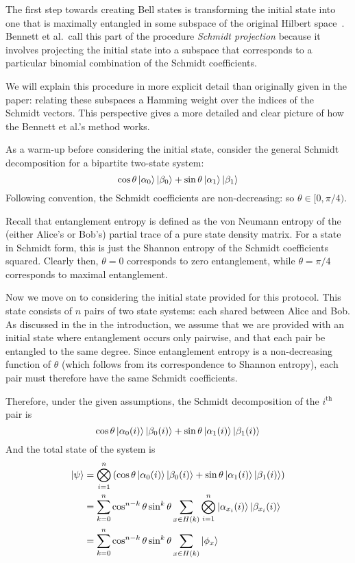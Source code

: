 The first step towards creating Bell states is transforming the initial state into one that is maximally entangled in some subspace of the original Hilbert space~\cite{bennett1996concentrating}.
Bennett et al.\ call this part of the procedure \emph{Schmidt projection} because it involves projecting the initial state into a subspace that corresponds to a particular binomial combination of the Schmidt coefficients.

We will explain this procedure in more explicit detail than originally given in the paper: relating these subspaces a Hamming weight over the indices of the Schmidt vectors. 
This perspective gives a more detailed and clear picture of how the Bennett et al.'s method works.

As a warm-up before considering the initial state, consider the general Schmidt decomposition for a bipartite two-state system:
$$
\cos\theta \ket{\alpha_0} \ket{\beta_0} + 
\sin\theta \ket{\alpha_1} \ket{\beta_1}
$$
Following convention, the Schmidt coefficients are non-decreasing: so $\theta \in [0, \pi/4)$.

Recall that entanglement entropy is defined as the von Neumann entropy of the (either Alice's or Bob's) partial trace of a pure state density matrix.
For a state in Schmidt form, this is just the Shannon entropy of the Schmidt coefficients squared.
Clearly then, $\theta = 0$ corresponds to zero entanglement, while $\theta = \pi/4$ corresponds to maximal entanglement.

Now we move on to considering the initial state provided for this protocol. This state consists of $n$ pairs of two state systems: each shared between Alice and Bob. As discussed in the in the introduction, we assume that we are provided with an initial state where entanglement occurs only pairwise, and that each pair be entangled to the same degree. Since entanglement entropy is a non-decreasing function of $\theta$  (which follows from its correspondence to Shannon entropy), each pair must therefore have the same Schmidt coefficients.

Therefore, under the given assumptions, the Schmidt decomposition of the $i^{\text{th}}$ pair is  
$$
\cos\theta \ket{\alpha_0(i)} \ket{\beta_0(i)} + 
\sin\theta \ket{\alpha_1(i)} \ket{\beta_1(i)}
$$
And the total state of the system is
\begin{align*}
	\ket{\psi} &= \bigotimes_{i=1}^n \left( 
	\cos\theta \ket{\alpha_0(i)} \ket{\beta_0(i)} + 
	\sin\theta \ket{\alpha_1(i)} \ket{\beta_1(i)} \right) \\
	&= \sum_{k=0}^n \cos^{n-k}\theta \sin^k\theta
	\sum_{x \in H(k)} \bigotimes_{i=1}^n 
	\ket{\alpha_{x_i}(i)} \ket{\beta_{x_i}(i)} \\
	&=  \sum_{k=0}^n \cos^{n-k}\theta \sin^k\theta
	\sum_{x \in H(k)} \ket{\phi_x}
\end{align*}

